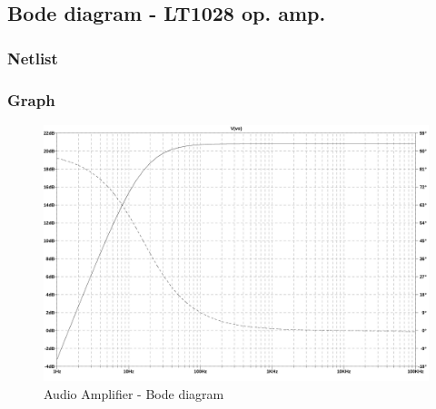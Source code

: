 \documentclass[10pt,a4paper]{article}
\begin{document}
\subsection{Bode diagram - LT1028 op. amp.}
\subsubsection{Netlist}


\subsubsection{Graph}
\begin{figure}[H]
  \centering
  \includegraphics[width=14cm]{graph/1d3.jpg}
  \caption{Audio Amplifier - Bode diagram}
  \label{1d3graph}
\end{figure}
\end{document}
